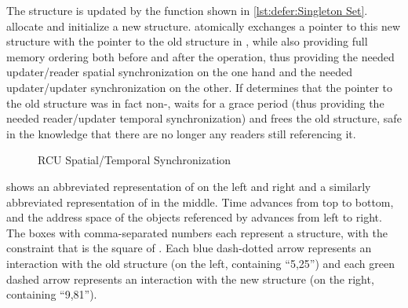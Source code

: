\begin{fcvref}
The structure is updated by the  function shown in
\cref{lst:defer:Singleton Set}.
 allocate and initialize a
new  structure.
 atomically exchanges a pointer to this new structure with
the pointer to the old structure in , while also providing
full memory ordering both before and after the  operation,
thus providing the needed updater/reader spatial synchronization on
the one hand and the needed updater/updater synchronization on the other.
If  determines that the pointer to the old structure was
in fact non-,  waits for a grace period (thus providing
the needed reader/updater temporal synchronization) and 
frees the old structure, safe in the knowledge that there are no
longer any readers still referencing it.
\end{fcvref}

\begin{figure}
\centering
{}
\caption{RCU Spatial/Temporal Synchronization}
\label{fig:defer:RCU Spatial/Temporal Synchronization}
\end{figure}

 shows an abbreviated
representation of  on the left and right and a similarly
abbreviated representation of  in the middle.
Time advances from top to bottom, and the address space of the objects
referenced by  advances from left to right.
The boxes with comma-separated numbers each represent a 
structure, with the constraint that  is the square of .
Each blue dash-dotted arrow represents an interaction with the old structure
(on the left, containing ``5,25'') and each green dashed arrow represents
an interaction with the new structure (on the right, containing ``9,81'').

